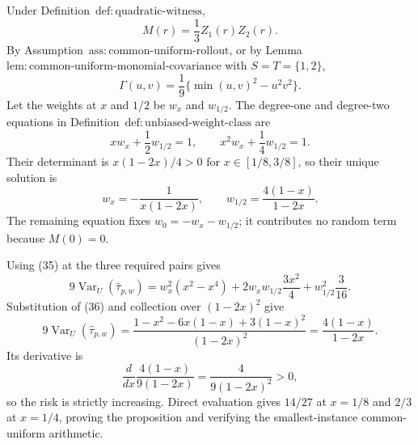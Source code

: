 Under Definition~\(\mathrm{def{:}quadratic\text{-}witness}\),
\[
M(r)=\frac13Z_1(r)Z_2(r).
\]
By Assumption~\(\mathrm{ass{:}common\text{-}uniform\text{-}rollout}\), or by Lemma~\(\mathrm{lem{:}common\text{-}uniform\text{-}monomial\text{-}covariance}\) with \(S=T=\{1,2\}\),
\[
\Gamma(u,v)=\frac19\{\min(u,v)^2-u^2v^2\}.
\tag{35}
\]
Let the weights at \(x\) and \(1/2\) be \(w_x\) and \(w_{1/2}\).  The degree-one and degree-two equations in Definition~\(\mathrm{def{:}unbiased\text{-}weight\text{-}class}\) are
\[
xw_x+\frac12w_{1/2}=1,
\qquad
x^2w_x+\frac14w_{1/2}=1.
\]
Their determinant is \(x(1-2x)/4>0\) for \(x\in[1/8,3/8]\), so their unique solution is
\[
w_x=-\frac1{x(1-2x)},
\qquad
w_{1/2}=\frac{4(1-x)}{1-2x}.
\tag{36}
\]
The remaining equation fixes \(w_0=-w_x-w_{1/2}\); it contributes no random term because \(M(0)=0\).

Using (35) at the three required pairs gives
\[
9\operatorname{Var}_U(\widehat\tau_{p,w})
=w_x^2(x^2-x^4)
+2w_xw_{1/2}\frac{3x^2}{4}
+w_{1/2}^2\frac3{16}.
\]
Substitution of (36) and collection over \((1-2x)^2\) give
\[
9\operatorname{Var}_U(\widehat\tau_{p,w})
=\frac{1-x^2-6x(1-x)+3(1-x)^2}{(1-2x)^2}
=\frac{4(1-x)}{1-2x}.
\]
Its derivative is
\[
\frac{d}{dx}\frac{4(1-x)}{9(1-2x)}
=\frac4{9(1-2x)^2}>0,
\]
so the risk is strictly increasing.  Direct evaluation gives \(14/27\) at \(x=1/8\) and \(2/3\) at \(x=1/4\), proving the proposition and verifying the smallest-instance common-uniform arithmetic.